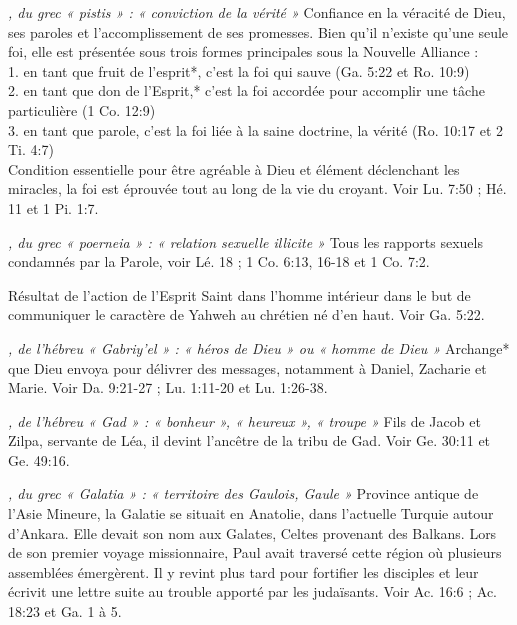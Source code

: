 \begin{multicols}{2}
\textit{, du grec « pistis » : « conviction de la vérité »}\newline
Confiance en la véracité de Dieu, ses paroles et l'accomplissement de ses promesses. Bien qu'il n'existe qu'une seule foi, elle est présentée sous trois formes principales sous la Nouvelle Alliance :
\\1. en tant que fruit de l'esprit*, c'est la foi qui sauve (Ga. 5:22 et Ro. 10:9)
\\2. en tant que don de l'Esprit,* c'est la foi accordée pour accomplir une tâche particulière (1 Co. 12:9)
\\3. en tant que parole, c'est la foi liée à la saine doctrine, la vérité (Ro. 10:17 et 2 Ti. 4:7)
\\Condition essentielle pour être agréable à Dieu et élément déclenchant les miracles, la foi est éprouvée tout au long de la vie du croyant. Voir Lu. 7:50 ; Hé. 11 et 1 Pi. 1:7.

\textit{, du grec « poerneia » : « relation sexuelle illicite »}\newline
Tous les rapports sexuels condamnés par la Parole, voir Lé. 18 ; 1 Co. 6:13, 16-18 et 1 Co. 7:2.

\textit{}\newline
Résultat de l'action de l'Esprit Saint dans l'homme intérieur dans le but de communiquer le caractère de Yahweh au chrétien né d'en haut. Voir Ga. 5:22.

\textit{, de l'hébreu « Gabriy'el » : « héros de Dieu » ou « homme de Dieu »}\newline
Archange* que Dieu envoya pour délivrer des messages, notamment à Daniel, Zacharie et Marie. Voir Da. 9:21-27 ; Lu. 1:11-20 et Lu. 1:26-38.

\textit{, de l'hébreu « Gad » : « bonheur », « heureux », « troupe »}\newline
Fils de Jacob et Zilpa, servante de Léa, il devint l'ancêtre de la tribu de Gad. Voir Ge. 30:11 et Ge. 49:16.

\textit{, du grec « Galatia » : « territoire des Gaulois, Gaule »}\newline
Province antique de l'Asie Mineure, la Galatie se situait en Anatolie, dans l'actuelle Turquie autour d'Ankara. Elle devait son nom aux Galates, Celtes provenant des Balkans. Lors de son premier voyage missionnaire, Paul avait traversé cette région où plusieurs assemblées émergèrent. Il y revint plus tard pour fortifier les disciples et leur écrivit une lettre suite au trouble apporté par les judaïsants. Voir Ac. 16:6 ; Ac. 18:23 et Ga. 1 à 5.


\end{multicols}
